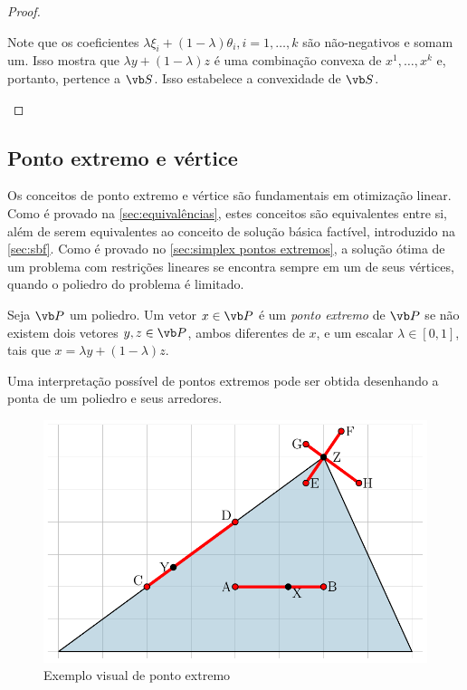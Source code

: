\begin{proof}
\begin{enumerate}[(a)]
     Note que os coeficientes $\lambda\xi_i+(1-\lambda)\theta_i, i=1,\ldots,k$ são não-negativos e somam um. Isso mostra que $\lambda y + (1-\lambda)z$ é uma combinação convexa de $x^1,\ldots,x^k$ e, portanto, pertence a $\vb S$. Isso estabelece a convexidade de $\vb S$.
 \end{enumerate}
\end{proof}

\subsection{Ponto extremo e vértice}\label{sec:ponto extremo e vértice}
Os conceitos de ponto extremo e vértice são fundamentais em otimização linear. Como é provado na \cref{sec:equivalências}, estes conceitos são equivalentes entre si, além de serem equivalentes ao conceito de solução básica factível, introduzido na \cref{sec:sbf}. Como é provado no \cref{sec:simplex pontos extremos}, a solução ótima de um problema com restrições lineares se encontra sempre em um de seus vértices, quando o poliedro do problema é limitado.

\begin{mydef}
 Seja $\vb P$ um poliedro. Um vetor $x\in \vb P$ é um \emph{ponto extremo} de $\vb P$ se não existem dois vetores $y, z\in \vb P$, ambos diferentes de $x$, e um escalar $\lambda\in[0,1]$, tais que $x=\lambda y+(1-\lambda)z$.
\end{mydef}

Uma interpretação possível de pontos extremos pode ser obtida desenhando a ponta de um poliedro e seus arredores.

\begin{figure}[H]
\centering
\caption{Exemplo visual de ponto extremo}\label{fig:exemplo_poliedro}
   \includegraphics[scale=1]{imagens/pontos_extremos.pdf}
\end{figure}


